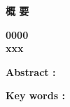 \vspace*{30pt}
\begin{center}
  {\Huge \textbf{概 要}}
\end{center}
\vspace{0.4cm}

\newpage
\vspace{0.8cm}
%
\vspace*{4em}
\begin{center}
  {\Large \textbf{0000}\\ }
  \vspace{2em}
  \textbf{xxx} \\
  \vspace{0em}
\end{center}

\noindent
\textbf{Abstract : }

\vspace{1em}
\noindent
\par
\textbf{Key words : }
